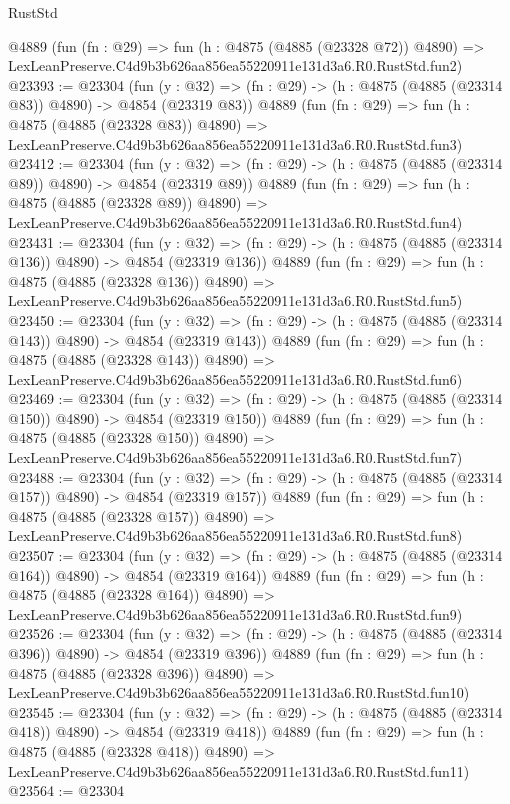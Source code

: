 \begin{lexlean}{RustStd}
\begin{coremodule}
    @4889
    (fun (fn : @29) =>
    fun (h : @4875 (@4885 (@23328 @72)) @4890) =>
    LexLeanPreserve.C4d9b3b626aa856ea55220911e131d3a6.R0.RustStd.fun2)
@23393 := @23304
    (fun (y : @32) => (fn : @29) -> (h : @4875 (@4885 (@23314 @83)) @4890) -> @4854 (@23319 @83))
    @4889
    (fun (fn : @29) =>
    fun (h : @4875 (@4885 (@23328 @83)) @4890) =>
    LexLeanPreserve.C4d9b3b626aa856ea55220911e131d3a6.R0.RustStd.fun3)
@23412 := @23304
    (fun (y : @32) => (fn : @29) -> (h : @4875 (@4885 (@23314 @89)) @4890) -> @4854 (@23319 @89))
    @4889
    (fun (fn : @29) =>
    fun (h : @4875 (@4885 (@23328 @89)) @4890) =>
    LexLeanPreserve.C4d9b3b626aa856ea55220911e131d3a6.R0.RustStd.fun4)
@23431 := @23304
    (fun (y : @32) => (fn : @29) -> (h : @4875 (@4885 (@23314 @136)) @4890) -> @4854 (@23319 @136))
    @4889
    (fun (fn : @29) =>
    fun (h : @4875 (@4885 (@23328 @136)) @4890) =>
    LexLeanPreserve.C4d9b3b626aa856ea55220911e131d3a6.R0.RustStd.fun5)
@23450 := @23304
    (fun (y : @32) => (fn : @29) -> (h : @4875 (@4885 (@23314 @143)) @4890) -> @4854 (@23319 @143))
    @4889
    (fun (fn : @29) =>
    fun (h : @4875 (@4885 (@23328 @143)) @4890) =>
    LexLeanPreserve.C4d9b3b626aa856ea55220911e131d3a6.R0.RustStd.fun6)
@23469 := @23304
    (fun (y : @32) => (fn : @29) -> (h : @4875 (@4885 (@23314 @150)) @4890) -> @4854 (@23319 @150))
    @4889
    (fun (fn : @29) =>
    fun (h : @4875 (@4885 (@23328 @150)) @4890) =>
    LexLeanPreserve.C4d9b3b626aa856ea55220911e131d3a6.R0.RustStd.fun7)
@23488 := @23304
    (fun (y : @32) => (fn : @29) -> (h : @4875 (@4885 (@23314 @157)) @4890) -> @4854 (@23319 @157))
    @4889
    (fun (fn : @29) =>
    fun (h : @4875 (@4885 (@23328 @157)) @4890) =>
    LexLeanPreserve.C4d9b3b626aa856ea55220911e131d3a6.R0.RustStd.fun8)
@23507 := @23304
    (fun (y : @32) => (fn : @29) -> (h : @4875 (@4885 (@23314 @164)) @4890) -> @4854 (@23319 @164))
    @4889
    (fun (fn : @29) =>
    fun (h : @4875 (@4885 (@23328 @164)) @4890) =>
    LexLeanPreserve.C4d9b3b626aa856ea55220911e131d3a6.R0.RustStd.fun9)
@23526 := @23304
    (fun (y : @32) => (fn : @29) -> (h : @4875 (@4885 (@23314 @396)) @4890) -> @4854 (@23319 @396))
    @4889
    (fun (fn : @29) =>
    fun (h : @4875 (@4885 (@23328 @396)) @4890) =>
    LexLeanPreserve.C4d9b3b626aa856ea55220911e131d3a6.R0.RustStd.fun10)
@23545 := @23304
    (fun (y : @32) => (fn : @29) -> (h : @4875 (@4885 (@23314 @418)) @4890) -> @4854 (@23319 @418))
    @4889
    (fun (fn : @29) =>
    fun (h : @4875 (@4885 (@23328 @418)) @4890) =>
    LexLeanPreserve.C4d9b3b626aa856ea55220911e131d3a6.R0.RustStd.fun11)
@23564 := @23304

\end{coremodule}
\end{lexlean}
